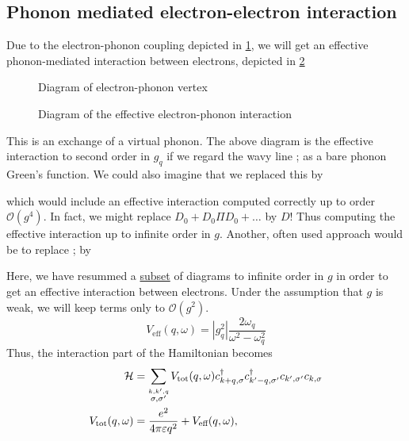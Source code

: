 \subsection{Phonon mediated electron-electron interaction}

Due to the electron-phonon coupling depicted in \cref{fig:el-ph-vertex}, we will get an effective phonon-mediated interaction between electrons, depicted in \cref{fig:el-ph-interaction}

\begin{figure}
	\centering
	
	\caption{Diagram of electron-phonon vertex}
	\label{fig:el-ph-vertex}
\end{figure}


\begin{figure}
	\centering
	
	\caption{Diagram of the effective electron-phonon interaction}
	\label{fig:el-ph-interaction}
\end{figure}


This is an exchange of a virtual phonon. The above diagram is the effective interaction to second order in $g_q$ if we regard the wavy line ; as a bare phonon Green's function. We could also imagine that we replaced this by

which would include an effective interaction computed correctly up to order $\mathcal{O}(g^4)$. In fact, we might replace $D_0 + D_0\Pi D_0 +\dots$ by $D!$ Thus computing the effective interaction up to infinite order in $g$. Another, often used approach would be to replace ; by  

Here, we have resummed a \underline{subset} of diagrams to infinite order in $g$ in order to get an effective interaction between electrons. Under the assumption that $g$ is weak, we will keep terms only to $\mathcal{O}(g^2)$.
\begin{equation}
V_{\text{eff}}(q, \omega) = |g_q^2|\frac{2\omega_q}{\omega^2-\omega_q^2}
\end{equation}
Thus, the interaction part of the Hamiltonian becomes 
\begin{align}
\mathcal{H} &= \sum_{\stackrel{k,k',q}{\sigma,\sigma'}}V_{\text{tot}}(q, \omega)c_{k+q, \sigma}^\dagger c_{k'-q, \sigma'}^\dagger c_{k', \sigma'}c_{k,\sigma} \\
V_{\text{tot}}(q, \omega) &= \frac{e^2}{4\pi\varepsilon q^2} + V_{\text{eff}}(q, \omega),
\end{align}

